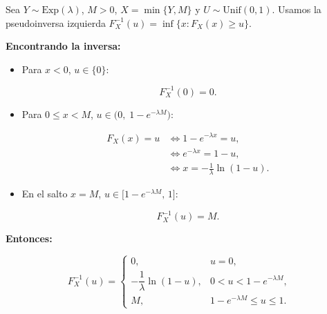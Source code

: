 \documentclass[10pt,a4paper]{article}
\let\le\leqslant
\let\ge\geqslant
\let\leq\leqslant
\let\geq\geqslant
\let\le\leq
\let\ge\geq
\begin{document}
    Sea \(Y\sim\mathrm{Exp}(\lambda)\), \(M>0\), \(X=\min\{Y,M\}\) y
\(U\sim\mathrm{Unif}(0,1)\). Usamos la pseudoinversa izquierda
\(F_X^{-1}(u)=\inf\{x:F_X(x)\ge u\}\).

\textbf{Encontrando la inversa:}

\begin{itemize}
\item
  Para \(x<0\), \(u\in\{0\}\):

  \[
  F_X^{-1}(0)=0.
  \]
\item
  Para \(0\le x<M\), \(u\in\big(0,\;1-e^{-\lambda M}\big)\):

  \[
  \begin{aligned}
  F_X(x)=u 
  &\iff 1-e^{-\lambda x}=u,\\
  &\iff e^{-\lambda x}=1-u,\\
  &\iff x=-\frac{1}{\lambda}\ln(1-u).
  \end{aligned}
  \]
\item
  En el salto \(x=M\), \(u\in\big[1-e^{-\lambda M},\,1\big]\):

  \[
  F_X^{-1}(u)=M.
  \]
\end{itemize}

\textbf{Entonces:}

\[
F_X^{-1}(u)=
\begin{cases}
0, & u=0,\\[6pt]
-\dfrac{1}{\lambda}\ln(1-u), & 0<u<1-e^{-\lambda M},\\[10pt]
M, & 1-e^{-\lambda M}\le u\le 1.
\end{cases}
\]
\end{document}
